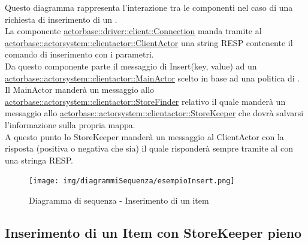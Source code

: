 \documentclass{scalatekids-article}
\begin{document}
Questo diagramma rappresenta l'interazione tra le componenti nel caso di una richiesta di inserimento di un .\\
La componente \hyperref[sec:actorbase::driver::client::Connection]{actorbase::driver::client::Connection} 
manda tramite  al \hyperref[sec:actorbase::actorsystem::clientactor::ClientActor]{actorbase::actorsystem::clientactor::ClientActor} 
una string RESP contenente il comando di inserimento  con 
i parametri.\\ %
Da questo componente parte il messaggio di Insert(key, value) ad un \hyperref[sec:actorbase::actorsystem::clientactor::MainActor]{actorbase::actorsystem::clientactor::MainActor} scelto in base ad una 
politica di . Il MainActor manderà un messaggio allo \hyperref[sec:actorbase::actorsystem::clientactor::StoreFinder]{actorbase::actorsystem::clientactor::StoreFinder} relativo il quale manderà un messaggio allo \hyperref[sec:actorbase::actorsystem::clientactor::StoreKeeper]{actorbase::actorsystem::clientactor::StoreKeeper} che dovrà salvarsi l'informazione 
sulla propria mappa.\\
A questo punto lo StoreKeeper manderà un messaggio al ClientActor con la risposta 
(positiva o negativa che sia) il quale risponderà sempre tramite  al  con una stringa RESP.
\begin{figure}[H]
  \begin{center}
    \texttt{[image: img/diagrammiSequenza/esempioInsert.png]}
    \caption{Diagramma di sequenza - Inserimento di un item}
  \end{center}
\end{figure}

\subsection{Inserimento di un Item con StoreKeeper pieno}
\end{document}
